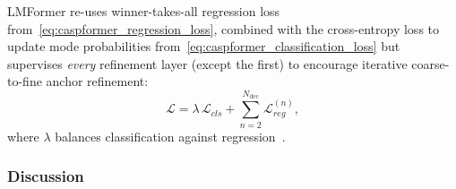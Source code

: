 LMFormer re-uses winner-takes-all regression loss from~\autoref{eq:caspformer_regression_loss}, combined with the cross-entropy loss to update mode probabilities from~\autoref{eq:caspformer_classification_loss} but supervises \emph{every} refinement layer (except the first) to encourage iterative coarse-to-fine anchor refinement:
\begin{equation}
  \mathcal{L}
  = \lambda\,\mathcal{L}_{cls}
    + \sum_{n=2}^{N_{\text{dec}}}\mathcal{L}_{reg}^{(n)},
  \label{eq:lm_loss}
\end{equation}
where \(\lambda\) balances classification against regression~\cite{lmformerYadav2025}.

\subsubsection{Discussion} %

